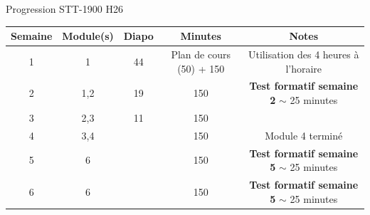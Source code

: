 \documentclass[12pt,french]{article}
\begin{document}
\Large{Progression STT-1900 H26}


\begin{table}[h]
    \centering
    \begin{tabular}{|c|c|c|c|c|}
    \hline
       Semaine  & Module(s) & Diapo & Minutes & Notes \\
       \hline
        1   & 1 & 44 & Plan de cours (50) + 150 & Utilisation des 4 heures à l'horaire\\
        \hline
        2 &1,2 &19 & 150& \textbf{Test formatif semaine 2} $\sim$ 25 minutes \\
        \hline
         3 &2,3 &11 & 150&  \\
        \hline
         4 &3,4 &  & 150& Module 4 terminé \\
        \hline
        5 &6 &  & 150& \textbf{Test formatif semaine 5} $\sim$ 25 minutes \\
        \hline
        6 &6 &  & 150& \textbf{Test formatif semaine 5} $\sim$ 25 minutes \\
        \hline        
    \end{tabular}

\end{table}
\end{document}
